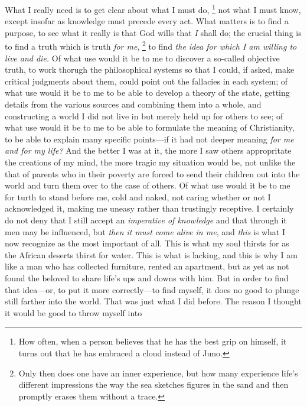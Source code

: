 What I really need is to get clear about what I must do,
  \footnote{
  How often, when a person believes that he has the best grip
      on himself, it turns out that he has embraced a cloud instead
      of Juno.
  }
  not what I must know, except insofar as knowledge must precede
  every act.
What matters is to find a purpose, to see what it really is
  that God wills that \textit{I} shall do; the crucial thing is
  to find a truth which is truth \textit{for me},
  \footnote{
  Only then does one have an inner experience, but how many
      experience life's different impressions the way the sea sketches
      figures in the sand and then promptly erases them without a
      trace.
  }
  to find \textit{the idea for which I am willing to live and
  die.}
Of what use would it be to me to discover a so-called
  objective truth, to work thorugh the philosophical systems so
  that I could, if asked, make critical judgments about them,
  could point out the fallacies in each system; of what use would
  it be to me to be able to develop a theory of the state,
  getting details from the various sources and combining them into
  a whole, and constructing a world I did not live in but merely
  held up for others to see; of what use would it be to me to
  be able to formulate the meaning of Christianity, to be able to
  explain many specific points---if it had not deeper meaning
  \textit{for me and for my life?}
And the better I was at it, the more I saw others
  appropritate the creations of my mind, the more tragic my
  situation would be, not unlike the that of parents who in their
  poverty are forced to send their children out into the world
  and turn them over to the case of others.
Of what use would it be to me for turth to stand before me,
  cold and naked, not caring whether or not I acknowledged it,
  making me uneasy rather than trustingly receptive.
I certainly do not deny that I still accept an
  \textit{imperative of knowledge} and that through it men may be
  influenced, but \textit{then it must come alive in me}, and
  \textit{this} is what I now recognize as the most important of
  all.
This is what my soul thirsts for as the African deserts thirst
  for water.
This is what is lacking, and this is why I am like a man
  who has collected furniture, rented an apartment, but as yet as
  not found the beloved to share life's ups and downs with him.
But in order to find that idea---or, to put it more
  correctly---to find myself, it does no good to plunge still
  farther into the world.
That was just what I did before.
The reason I thought it would be good to throw myself into
